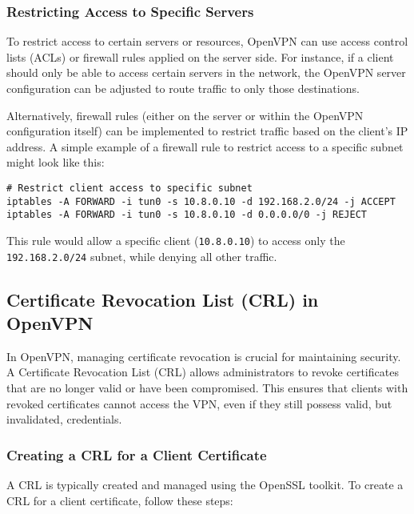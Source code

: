 \subsubsection{Restricting Access to Specific Servers}

To restrict access to certain servers or resources, OpenVPN can use access control lists (ACLs) or firewall rules applied on the server side. For instance, if a client should only be able to access certain servers in the network, the OpenVPN server configuration can be adjusted to route traffic to only those destinations.

Alternatively, firewall rules (either on the server or within the OpenVPN configuration itself) can be implemented to restrict traffic based on the client’s IP address. A simple example of a firewall rule to restrict access to a specific subnet might look like this:
\begin{verbatim}
# Restrict client access to specific subnet
iptables -A FORWARD -i tun0 -s 10.8.0.10 -d 192.168.2.0/24 -j ACCEPT
iptables -A FORWARD -i tun0 -s 10.8.0.10 -d 0.0.0.0/0 -j REJECT
\end{verbatim}
This rule would allow a specific client (\texttt{10.8.0.10}) to access only the \texttt{192.168.2.0/24} subnet, while denying all other traffic.

\subsection{Certificate Revocation List (CRL) in OpenVPN}

In OpenVPN, managing certificate revocation is crucial for maintaining security. A Certificate Revocation List (CRL) allows administrators to revoke certificates that are no longer valid or have been compromised. This ensures that clients with revoked certificates cannot access the VPN, even if they still possess valid, but invalidated, credentials.

\subsubsection{Creating a CRL for a Client Certificate}

A CRL is typically created and managed using the OpenSSL toolkit. To create a CRL for a client certificate, follow these steps:

